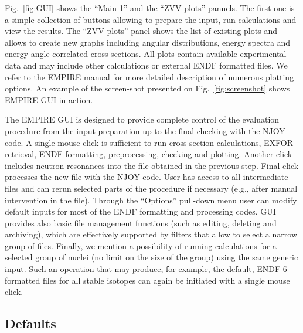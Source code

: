 Fig.~\ref{fig:GUI} shows the ``Main 1'' and the ``ZVV plots'' pannels. The
first one is a simple collection of buttons allowing to prepare the input,
run calculations and view the results. The ``ZVV plots'' panel shows the
list of existing plots and allows to create new graphs including angular
distributions, energy spectra and energy-angle correlated cross sections.
All plots contain available experimental data and may include other
calculations or external ENDF formatted files. We refer to the EMPIRE manual
for more detailed description of numerous plotting options. An example of
the screen-shot presented on Fig.~\ref{fig:screenshot} shows EMPIRE GUI in
action.

\begin{figure*}[htbp]
\caption{Screen-shot of the EMPIRE GUI with a generated plot of cross
sections for the inelastic scattering to the first 4 levels in $^{89}$Y.
Note the capability of the interface to multiply results by a power of 10 to
separate the curves.}
\label{fig:screenshot}
\end{figure*}

The EMPIRE GUI is designed to provide complete control of the evaluation
procedure from the input preparation up to the final checking with the NJOY
code. A single mouse click is sufficient to run cross section calculations,
EXFOR retrieval, ENDF formatting, preprocessing, checking and plotting.
Another click includes neutron resonances into the file obtained in the
previous step. Final click processes the new file with the NJOY code. User
has access to all intermediate files and can rerun selected parts of the
procedure if necessary (e.g., after manual intervention in the file).
Through the ``Options'' pull-down menu user can modify default inputs for
most of the ENDF formatting and processing codes. GUI provides also basic
file management functions (such as editing, deleting and archiving), which
are effectively supported by filters that allow to select a narrow group of
files. Finally, we mention a possibility of running calculations for a
selected group of nuclei (no limit on the size of the group) using the same
generic input. Such an operation that may produce, for example, the default,
ENDF-6 formatted files for all stable isotopes can again be initiated with a
single mouse click.

\subsection{Defaults}

